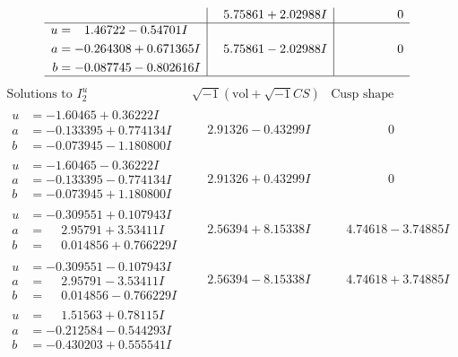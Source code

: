 \documentclass[1p]{elsarticle_modified}
\theoremstyle{definition}
\newcommand{\I}{\sqrt{-1}}
\begin{document}
$$\begin{array}{c|c|c}
 & \phantom{-}5.75861 + 2.02988 I & \phantom{-0.000000 } 0 \\ \hline\begin{aligned}
u &= \phantom{-}1.46722 - 0.54701 I \\
a &= -0.264308 + 0.671365 I \\
b &= -0.087745 - 0.802616 I\end{aligned}
 & \phantom{-}5.75861 - 2.02988 I & \phantom{-0.000000 } 0\\
 \hline 
 \end{array}$$\newpage$$\begin{array}{c|c|c}  
\text{Solutions to }I^u_{2}& \I (\text{vol} + \sqrt{-1}CS) & \text{Cusp shape}\\
 \hline 
\begin{aligned}
u &= -1.60465 + 0.36222 I \\
a &= -0.133395 + 0.774134 I \\
b &= -0.073945 - 1.180800 I\end{aligned}
 & \phantom{-}2.91326 - 0.43299 I & \phantom{-0.000000 } 0 \\ \hline\begin{aligned}
u &= -1.60465 - 0.36222 I \\
a &= -0.133395 - 0.774134 I \\
b &= -0.073945 + 1.180800 I\end{aligned}
 & \phantom{-}2.91326 + 0.43299 I & \phantom{-0.000000 } 0 \\ \hline\begin{aligned}
u &= -0.309551 + 0.107943 I \\
a &= \phantom{-}2.95791 + 3.53411 I \\
b &= \phantom{-}0.014856 + 0.766229 I\end{aligned}
 & \phantom{-}2.56394 + 8.15338 I & \phantom{-}4.74618 - 3.74885 I \\ \hline\begin{aligned}
u &= -0.309551 - 0.107943 I \\
a &= \phantom{-}2.95791 - 3.53411 I \\
b &= \phantom{-}0.014856 - 0.766229 I\end{aligned}
 & \phantom{-}2.56394 - 8.15338 I & \phantom{-}4.74618 + 3.74885 I \\ \hline\begin{aligned}
u &= \phantom{-}1.51563 + 0.78115 I \\
a &= -0.212584 - 0.544293 I \\
b &= -0.430203 + 0.555541 I\end{aligned}

\end{array}$$
\end{document}
